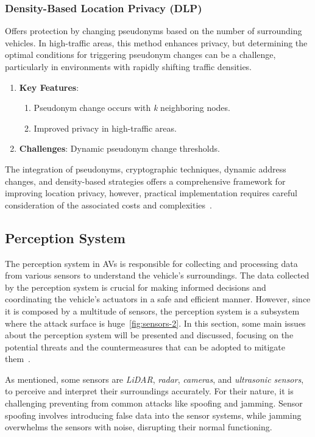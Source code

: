\subsubsection{Density-Based Location Privacy (DLP)}
Offers protection by changing pseudonyms based on the number of surrounding vehicles.
In high-traffic areas, this method enhances privacy, but determining the optimal conditions for triggering pseudonym changes can be a challenge,
particularly in environments with rapidly shifting traffic densities.
\begin{enumerate}
    \item \textbf{Key Features}:
    \begin{enumerate}
        \item Pseudonym change occurs with \emph{k} neighboring nodes.
        \item Improved privacy in high-traffic areas.
    \end{enumerate}
    \item \textbf{Challenges}: Dynamic pseudonym change thresholds.
\end{enumerate}

The integration of pseudonyms, cryptographic techniques, dynamic address changes, and density-based strategies offers a comprehensive framework
for improving location privacy, however, practical implementation requires careful consideration of the associated costs and complexities~\cite{macena2023cybersecurity}.


\subsection{Perception System}\label{subsec:perception-system}

The perception system in AVs is responsible for collecting and processing data from various sensors to understand the vehicle's surroundings.
The data collected by the perception system is crucial for making informed decisions and coordinating the vehicle's actuators in a safe and efficient manner.
However, since it is composed by a multitude of sensors, the perception system is a subsystem where the attack surface is huge~\ref{fig:sensors-2}.
In this section, some main issues about the perception system will be presented and discussed, focusing on the potential threats and the countermeasures that can be adopted to mitigate them~\cite{sensors}.

As mentioned, some sensors are \textit{LiDAR}, \textit{radar}, \textit{cameras}, and \textit{ultrasonic sensors}, to perceive and interpret their surroundings accurately.
For their nature, it is challenging preventing from common attacks like spoofing and jamming.
Sensor spoofing involves introducing false data into the sensor systems, while jamming overwhelms the sensors with noise, disrupting their normal functioning.

